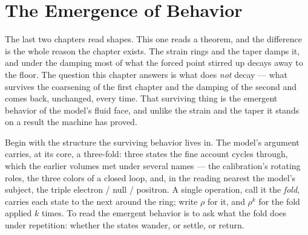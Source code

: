 \chapter{The Emergence of Behavior}

The last two chapters read shapes. This one reads a theorem, and the difference
is the whole reason the chapter exists. The strain rings and the taper damps it,
and under the damping most of what the forced point stirred up decays away to the
floor. The question this chapter answers is what does \emph{not} decay --- what
survives the coarsening of the first chapter and the damping of the second and
comes back, unchanged, every time. That surviving thing is the emergent behavior
of the model's fluid face, and unlike the strain and the taper it stands on a
result the machine has proved.

Begin with the structure the surviving behavior lives in. The model's argument
carries, at its core, a three-fold: three states the fine account cycles
through, which the earlier volumes met under several names --- the calibration's
rotating roles, the three colors of a closed loop, and, in the reading nearest
the model's subject, the triple electron / null / positron. A single operation,
call it the \emph{fold}, carries each state to the next around the ring; write
$\rho$ for it, and $\rho^{k}$ for the fold applied $k$ times. To read the
emergent behavior is to ask what the fold does under repetition: whether the
states wander, or settle, or return.

